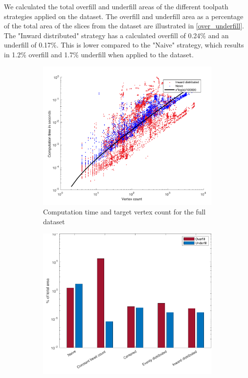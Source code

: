 We calculated the total overfill and underfill areas of the different toolpath strategies applied on the dataset. 
The overfill and underfill area as a percentage of the total area of the slices from the dataset are illustrated in \cref{over_underfill}.  
The "Inward distributed" strategy has a calculated overfill of 0.24\% and an underfill of 0.17\%.
This is lower compared to the "Naive" strategy, which results in 1.2\% overfill and 1.7\% underfill when applied to the dataset.

\begin{figure}
\centering
\setlength{\figheight}{0.2\textwidth}
\setlength{\figwidth}{0.24\textwidth}
\begin{subfigure}{\figwidth}\centering
\includegraphics[height=\figheight]{sources/validation/computime2.pdf}
\caption{Computation time and target vertex count for the full dataset}
\label{computime}
\end{subfigure}
\begin{subfigure}{\figwidth}\centering
\includegraphics[height=\figheight]{sources/validation/overunderfill.pdf}

\end{subfigure}
\end{figure}
